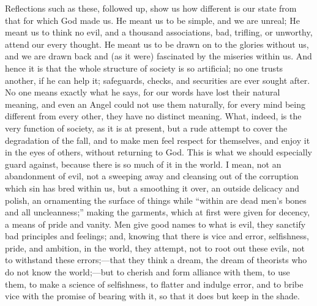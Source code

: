 Reflections such as these, followed up, show us how different is
our state from that for which God made us. He meant us to be simple,
and we are unreal; He meant us to think no evil, and a thousand
associations, bad, trifling, or unworthy, attend our every thought. He
meant us to be drawn on to the glories without us, and we are drawn
back and (as it were) fascinated by the miseries within us. And hence
it is that the whole structure of society is so artificial; no one
trusts another, if he can help it; safeguards, checks, and securities
are ever sought after. No one means exactly what he says, for our
words have lost their natural meaning, and even an Angel could not use
them naturally, for every mind being different from every other, they
have no distinct meaning. What, indeed, is the very function of
society, as it is at present, but a rude attempt to cover the
degradation of the fall, and to make men feel respect for themselves,
and enjoy it in the eyes of others, without returning to God. This is
what we should especially guard against, because there is so much of
it in the world. I mean, not an abandonment of evil, not a sweeping
away and cleansing out of the corruption which sin has bred within us,
but a smoothing it over, an outside delicacy and polish, an
ornamenting the surface of things while ``within are dead men's
bones and all uncleanness;'' making the garments, which at first
were given for decency, a means of pride and vanity. Men give good
names to what is evil, they sanctify bad principles and feelings; and,
knowing that there is vice and error, selfishness, pride, and
ambition, in the world, they attempt, not to root out these evils, not
to withstand these errors;—that they think a dream, the dream of
theorists who do not know the world;—but to cherish and form
alliance with them, to use them, to make a science of selfishness, to
flatter and indulge error, and to bribe vice with the promise of
bearing with it, so that it does but keep in the shade.

